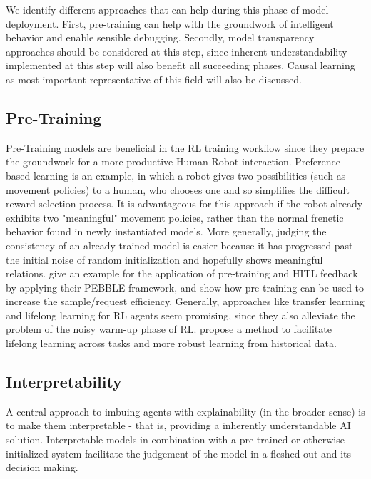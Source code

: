 \documentclass[twoside,11pt]{article}
\begin{document}
We identify different approaches that can help during this phase of model deployment.
First, pre-training can help with the groundwork of intelligent behavior and enable sensible debugging. Secondly, model transparency approaches should be considered at this step, since inherent understandability implemented at this step will also benefit all succeeding phases. Causal learning as most important representative of this field will also be discussed.

\subsection{Pre-Training}

Pre-Training models are beneficial in the RL training workflow since they prepare the groundwork for a more productive Human Robot interaction.
Preference-based learning is an example, in which a robot gives two possibilities (such as movement policies) to a human, who chooses one and so simplifies the difficult reward-selection process. It is advantageous for this approach if the robot already exhibits two "meaningful" movement policies, rather than the normal frenetic behavior found in newly instantiated models.
More generally, judging the consistency of an already trained model is easier because it has progressed past the initial noise of random initialization and hopefully shows meaningful relations. \cite{LeeSmithAbbeel:2021:FeedbackPreferenceHITLLearningPEBBLE} give an example for the application of pre-training and HITL feedback by applying their PEBBLE framework, and show how pre-training can be used to increase the sample/request efficiency.
Generally, approaches like transfer learning and lifelong learning for RL agents seem promising, since they also alleviate the problem of the noisy warm-up phase of RL. \citet{AzarLazaricBrunskill:2013:LifelongLearning} propose a method to facilitate lifelong learning across tasks and more robust learning from historical data.

\subsection{Interpretability}
\label{subsec:interpretability}

A central approach to imbuing agents with explainability (in the broader sense) is to make them interpretable - that is, providing a inherently understandable AI solution. Interpretable models in combination with a pre-trained or otherwise initialized system facilitate the judgement of the model in a fleshed out and its decision making.
\end{document}
